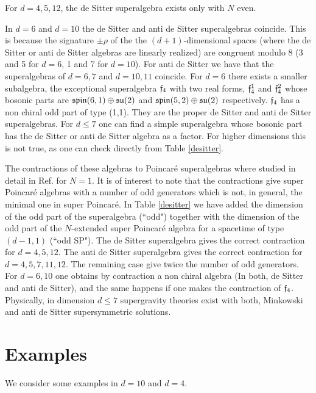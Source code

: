 \documentclass[a4paper,12pt]{article}
\begin{document}
For $d=4,5,12$, the de Sitter superalgebra exists only with $N$
even.

In $d=6$ and $d=10$ the de Sitter and anti de Sitter superalgebras
coincide. This is because the signature  $\pm \rho$  of the  the
$(d+1)$-dimensional spaces (where the de Sitter or anti de Sitter
algebras are linearly realized) are congruent modulo 8 (3 and 5
for $d=6$, 1 and 7 for $d=10$). For anti de Sitter we have that
the superalgebras of $d=6,7$ and $d=10,11$ coincide. For $d=6$
there exists a smaller subalgebra, the exceptional superalgebra
$\mathfrak{f}_4$ with two real forms, $\mathfrak{f}_4^1$ and $\mathfrak{f}_4^2$ whose bosonic
parts are $\mathfrak{spin}(6,1)\oplus \mathfrak{su}(2)$ and $\mathfrak{spin}(5,2)\oplus
\mathfrak{su}(2)$ respectively. $\mathfrak{f}_4$ has a non chiral odd part of type
(1,1). They are the proper de Sitter and anti de Sitter
superalgebras. For $d\leq 7$ one can find a simple superalgebra
whose bosonic part has the de Sitter or anti de Sitter algebra as
a factor. For higher dimensions this is not true, as one can check
directly from Table \ref{desitter}.

The contractions of these algebras to Poincar\'e superalgebras
where studied in detail in Ref.\cite{dflv} for $N=1$.  It is of
interest  to note that the contractions give super Poincar\'e
algebras with  a number of odd generators which is not, in
general,  the minimal one in super Poincar\'e. In Table
\ref{desitter} we have added the dimension of the odd part of the
superalgebra (``odd") together with the dimension of the odd part
of the $N$-extended super Poincar\'e algebra for a spacetime of
type $(d-1,1)$ (``odd SP"). The de Sitter superalgebra gives the
correct contraction for $d=4,5,12$. The anti de Sitter
superalgebra gives the correct contraction for $d=4,5,7,11,12$.
The remaining case give twice the number of odd generators. For
$d=6,10$ one obtains by contraction a non chiral algebra (In both,
de Sitter and anti de Sitter), and the same happens if one makes
the contraction of $\mathfrak{f}_4$. Physically, in dimension $d\leq 7$
supergravity theories exist with both, Minkowski and anti de
Sitter supersymmetric solutions.









\section{Examples}

We consider some examples in  $d=10$ and $d=4$.
\end{document}
